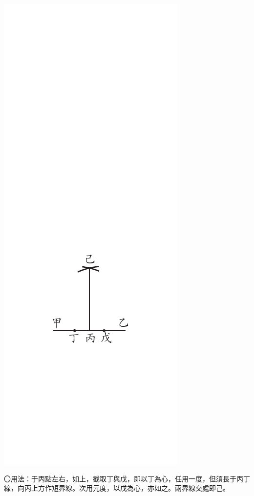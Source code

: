 \documentclass[12pt,b5paper,landscape]{article}
\newcommand{\bcom}[1]{〇#1}
\begin{document}
\begin{multicols}{2}
\begin{center}
\includegraphics[angle=90]{eu51}
\end{center}
\bcom{用法：于丙點左右，如上，截取丁與戊，即以丁為心，任用一度，但須長于丙丁線，向丙上方作短界線。次用元度，以戊為心，亦如之。兩界線交處即己。}
\begin{center}

\end{center}
\end{multicols}
\end{document}
